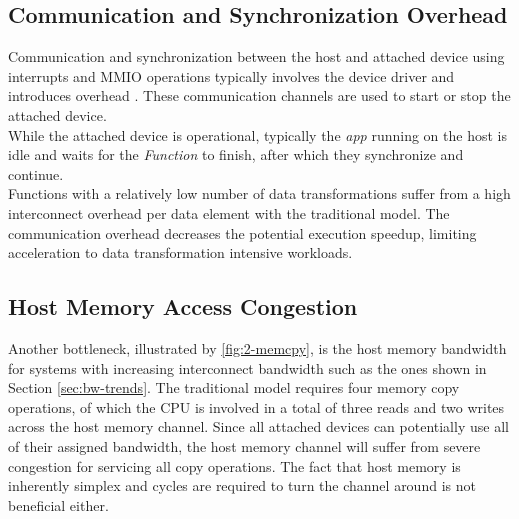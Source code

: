 \subsection{Communication and Synchronization Overhead}
Communication and synchronization between the host and attached device using interrupts and MMIO operations typically involves the device driver and introduces overhead \cite{capi-zurich}. These communication channels are used to start or stop the attached device.\\
While the attached device is operational, typically the \textit{app} running on the host is idle and waits for the \textit{Function} to finish, after which they synchronize and continue.\\
Functions with a relatively low number of data transformations suffer from a high interconnect overhead per data element with the traditional model. The communication overhead decreases the potential execution speedup, limiting acceleration to data transformation intensive workloads.



\subsection{Host Memory Access Congestion}
Another bottleneck, illustrated by \autoref{fig:2-memcpy}, is the host memory bandwidth for systems with increasing interconnect bandwidth such as the ones shown in Section \ref{sec:bw-trends}. The traditional model requires four memory copy operations, of which the CPU is involved in a total of three reads and two writes across the host memory channel. Since all attached devices can potentially use all of their assigned bandwidth, the host memory channel will suffer from severe congestion for servicing all copy operations. The fact that host memory is inherently simplex and cycles are required to turn the channel around is not beneficial either.



